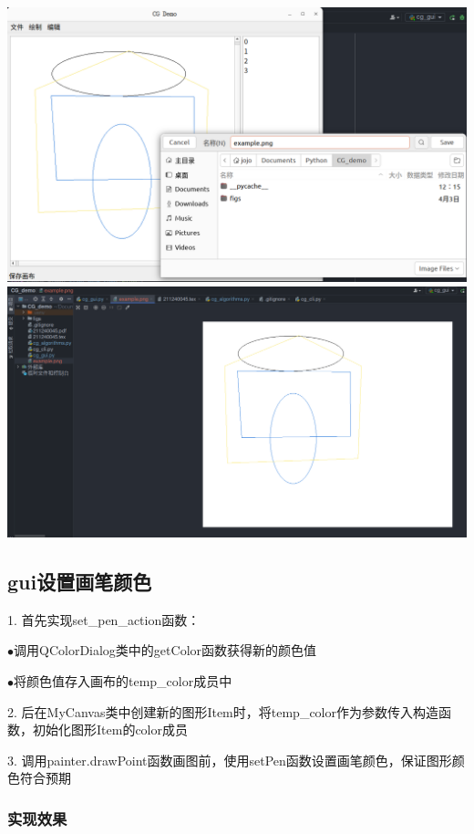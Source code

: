 \documentclass[a4paper,UTF8]{article}
\theoremstyle{definition}
\begin{document}
\begin{center}
	\includegraphics[width=6in]{报告/save.png}
	\includegraphics[width=6in]{报告/save_res.png}
\end{center}

\subsection{gui设置画笔颜色}

1. 首先实现set\_pen\_action函数：

$\bullet$调用QColorDialog类中的getColor函数获得新的颜色值

$\bullet$将颜色值存入画布的temp\_color成员中

2. 后在MyCanvas类中创建新的图形Item时，将temp\_color作为参数传入构造函数，初始化图形Item的color成员

3. 调用painter.drawPoint函数画图前，使用setPen函数设置画笔颜色，保证图形颜色符合预期

\subsubsection{实现效果}
\end{document}
